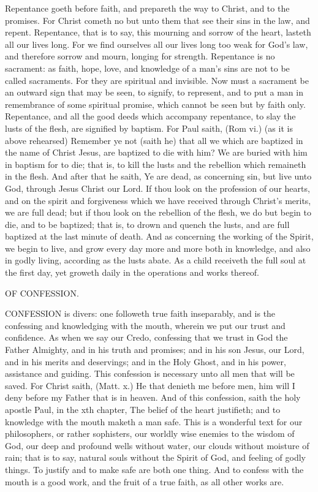 Repentance goeth before faith, and prepareth the way
to Christ, and to the promises. For Christ cometh no
but unto them that see their sins in the law, and repent. 
Repentance, that is to say, this mourning and sorrow of 
the heart, lasteth all our lives long. For we find ourselves 
all our lives long too weak for God's law, and therefore 
sorrow and mourn, longing for strength. Repentance is 
no sacrament: as faith, hope, love, and knowledge of a 
man's sins are not to be called sacraments. For they are 
spiritual and invisible. Now must a sacrament be an outward
sign that may be seen, to signify, to represent, and 
to put a man in remembrance of some spiritual promise, 
which cannot be seen but by faith only. Repentance, 
and all the good deeds which accompany repentance, to 
slay the lusts of the flesh, are signified by baptism. For 
Paul saith, (Rom vi.) (as it is above rehearsed) Remember 
ye not (saith he) that all we which are baptized in the 
name of Christ Jesus, are baptized to die with him? We 
are buried with him in baptism for to die; that is, to kill
the lusts and the rebellion which remaineth in the flesh.
And after that he saith, Ye are dead, as concerning sin, 
but live unto God, through Jesus Christ our Lord. If 
thou look on the profession of our hearts, and on the 
spirit and forgiveness which we have received through 
Christ's merits, we are full dead; but if thou look on the 
rebellion of the flesh, we do but begin to die, and to be 
baptized; that is, to drown and quench the lusts, and are 
full baptized at the last minute of death. And as concerning
the working of the Spirit, we begin to live, and 
grow every day more and more both in knowledge, and 
also in godly living, according as the lusts abate. As a 
child receiveth the full soul at the first day, yet groweth 
daily in the operations and works thereof. 


OF CONFESSION. 

CONFESSION is divers: one followeth true faith inseparably,
and is the confessing and knowledging 
with the mouth, wherein we put our trust and confidence.
As when we say our Credo, confessing that we 
trust in God the Father Almighty, and in his truth and 
promises; and in his son Jesus, our Lord, and in his 
merits and deservings; and in the Holy Ghost, and in his 
power, assistance and guiding. This confession is necessary
unto all men that will be saved. For Christ saith, 
(Matt. x.) He that denieth me before men, him will I 
deny before my Father that is in heaven. And of this 
confession, saith the holy apostle Paul, in the xth chapter, 
The belief of the heart justifieth; and to knowledge with 
the mouth maketh a man safe. This is a wonderful text 
for our philosophers, or rather sophisters, our worldly 
wise enemies to the wisdom of God, our deep and profound
wells without water, our clouds without moisture of 
rain; that is to say, natural souls without the Spirit of 
God, and feeling of godly things. To justify and to 
make safe are both one thing. And to confess with the 
mouth is a good work, and the fruit of a true faith, as all 
other works are. 

